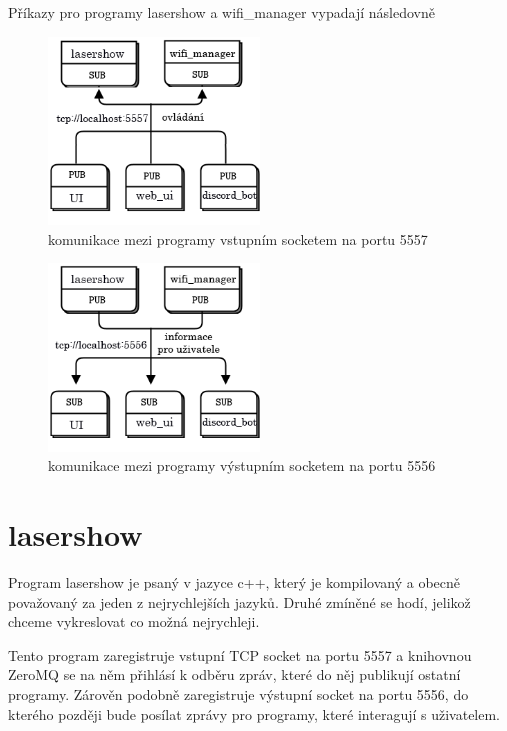 Příkazy pro programy lasershow a wifi\_manager vypadají následovně

\begin{figure}[!htb]
  \centering
  \includegraphics[width=0.5\textwidth]{img/tcp5557.png}
  \caption{\label{fig:tcp5557}komunikace mezi programy vstupním socketem na portu 5557}
\end{figure}
\begin{figure}[!htb]
  \centering
  \includegraphics[width=0.5\textwidth]{img/tcp5556.png}
  \caption{\label{fig:tcp5556}komunikace mezi programy výstupním socketem na portu 5556}
\end{figure}

\section{lasershow}

Program lasershow je psaný v jazyce c++, který je kompilovaný a obecně považovaný za jeden z nejrychlejších jazyků. Druhé zmíněné se hodí, jelikož chceme vykreslovat co možná nejrychleji.

Tento program zaregistruje vstupní TCP socket na portu 5557 a knihovnou ZeroMQ se na něm přihlásí k odběru zpráv, které do něj publikují ostatní programy. Zárověn podobně zaregistruje výstupní socket na portu 5556, do kterého později bude posílat zprávy pro programy, které interagují s uživatelem.

